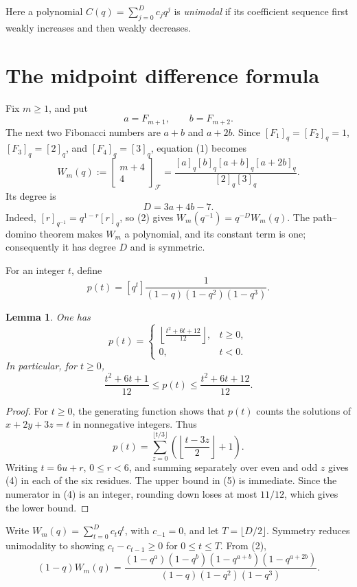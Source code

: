 \documentclass[11pt]{article}
\newtheorem{lemma}[theorem]{Lemma}
\newcommand{\qfib}[2]{\left[\!\begin{matrix}#1\\#2\end{matrix}\!\right]_{\!\mathcal F}}
\begin{document}
Here a polynomial \(C(q)=\sum_{j=0}^D c_jq^j\) is \emph{unimodal} if its
coefficient sequence first weakly increases and then weakly decreases.

\section{The midpoint difference formula}

Fix \(m\geq1\), and put
\[
  a=F_{m+1},\qquad b=F_{m+2}.
\]
The next two Fibonacci numbers are \(a+b\) and \(a+2b\).  Since
\([F_1]_q=[F_2]_q=1\), \([F_3]_q=[2]_q\), and
\([F_4]_q=[3]_q\), equation (1) becomes
\[
 W_m(q):=\qfib{m+4}{4}
 =\frac{[a]_q[b]_q[a+b]_q[a+2b]_q}{[2]_q[3]_q}.
 \tag{2}
\]
Its degree is
\[
 D=3a+4b-7. \tag{3}
\]
Indeed, \([r]_{q^{-1}}=q^{1-r}[r]_q\), so (2) gives
\(W_m(q^{-1})=q^{-D}W_m(q)\).  The path--domino theorem makes \(W_m\) a
polynomial, and its constant term is one; consequently it has degree \(D\)
and is symmetric.

For an integer \(t\), define
\[
 p(t)=[q^t]\frac{1}{(1-q)(1-q^2)(1-q^3)}.
\]

\begin{lemma}\label{lem:p}
One has
\[
 p(t)=
 \begin{cases}
 \displaystyle\left\lfloor\frac{t^2+6t+12}{12}\right\rfloor,&t\geq0,\\[6pt]
 0,&t<0.
 \end{cases} \tag{4}
\]
In particular, for \(t\geq0\),
\[
 \frac{t^2+6t+1}{12}\leq p(t)
 \leq\frac{t^2+6t+12}{12}. \tag{5}
\]
\end{lemma}

\begin{proof}
For \(t\geq0\), the generating function shows that \(p(t)\) counts the
solutions of \(x+2y+3z=t\) in nonnegative integers.  Thus
\[
 p(t)=\sum_{z=0}^{\lfloor t/3\rfloor}
 \left(\left\lfloor\frac{t-3z}{2}\right\rfloor+1\right).
\]
Writing \(t=6u+r\), \(0\leq r<6\), and summing separately over even and
odd \(z\) gives (4) in each of the six residues.  The upper bound in (5) is
immediate.  Since the numerator in (4) is an integer, rounding down loses at
most \(11/12\), which gives the lower bound.
\end{proof}

Write \(W_m(q)=\sum_{t=0}^Dc_tq^t\), with \(c_{-1}=0\), and let
\(T=\lfloor D/2\rfloor\).  Symmetry reduces unimodality to showing
\(c_t-c_{t-1}\geq0\) for \(0\leq t\leq T\).  From (2),
\[
 (1-q)W_m(q)=
 \frac{(1-q^a)(1-q^b)(1-q^{a+b})(1-q^{a+2b})}
 {(1-q)(1-q^2)(1-q^3)}. \tag{6}
\]
\end{document}
